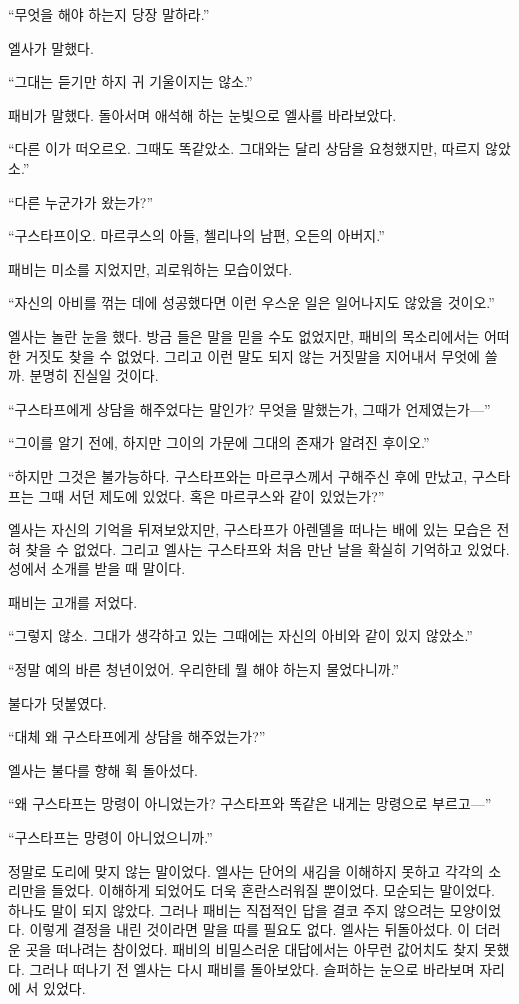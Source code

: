 ``무엇을 해야 하는지 당장 말하라.''

엘사가 말했다.

``그대는 듣기만 하지 귀 기울이지는 않소.''

패비가 말했다. 돌아서며 애석해 하는 눈빛으로 엘사를 바라보았다.

``다른 이가 떠오르오. 그때도 똑같았소. 그대와는 달리 상담을 요청했지만, 따르지 않았소.''

``다른 누군가가 왔는가?''

``구스타프이오. 마르쿠스의 아들, 첼리나의 남편, 오든의 아버지.''

패비는 미소를 지었지만, 괴로워하는 모습이었다.

``자신의 아비를 꺾는 데에 성공했다면 이런 우스운 일은 일어나지도 않았을 것이오.''

엘사는 놀란 눈을 했다. 방금 들은 말을 믿을 수도 없었지만, 패비의 목소리에서는 어떠한 거짓도 찾을 수 없었다. 그리고 이런 말도 되지 않는 거짓말을 지어내서 무엇에 쓸까. 분명히 진실일 것이다.

``구스타프에게 상담을 해주었다는 말인가? 무엇을 말했는가, 그때가 언제였는가—''

``그이를 알기 전에, 하지만 그이의 가문에 그대의 존재가 알려진 후이오.''

``하지만 그것은 불가능하다. 구스타프와는 마르쿠스께서 구해주신 후에 만났고, 구스타프는 그때 서던 제도에 있었다. 혹은 마르쿠스와 같이 있었는가?''

엘사는 자신의 기억을 뒤져보았지만, 구스타프가 아렌델을 떠나는 배에 있는 모습은 전혀 찾을 수 없었다. 그리고 엘사는 구스타프와 처음 만난 날을 확실히 기억하고 있었다. 성에서 소개를 받을 때 말이다.

패비는 고개를 저었다.

``그렇지 않소. 그대가 생각하고 있는 그때에는 자신의 아비와 같이 있지 않았소.''

``정말 예의 바른 청년이었어. 우리한테 뭘 해야 하는지 물었다니까.''

불다가 덧붙였다.

``대체 왜 구스타프에게 상담을 해주었는가?''

엘사는 불다를 향해 휙 돌아섰다.

``왜 구스타프는 망령이 아니었는가? 구스타프와 똑같은 내게는 망령으로 부르고—''

``구스타프는 망령이 아니었으니까.''

정말로 도리에 맞지 않는 말이었다. 엘사는 단어의 새김을 이해하지 못하고 각각의 소리만을 들었다. 이해하게 되었어도 더욱 혼란스러워질 뿐이었다. 모순되는 말이었다. 하나도 말이 되지 않았다. 그러나 패비는 직접적인 답을 결코 주지 않으려는 모양이었다. 이렇게 결정을 내린 것이라면 말을 따를 필요도 없다. 엘사는 뒤돌아섰다. 이 더러운 곳을 떠나려는 참이었다. 패비의 비밀스러운 대답에서는 아무런 값어치도 찾지 못했다. 그러나 떠나기 전 엘사는 다시 패비를 돌아보았다. 슬퍼하는 눈으로 바라보며 자리에 서 있었다.

